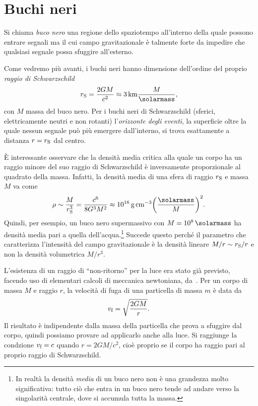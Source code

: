 \chapter{Buchi neri}
\label{sec:buchi-neri}

\label{definizione-buco-nero} Si chiama \emph{buco nero} una regione dello
spaziotempo all'interno della quale possono entrare segnali ma il cui campo
gravitazionale è talmente forte da impedire che qualsiasi segnale possa sfuggire
all'esterno.

Come vedremo più avanti, i buchi neri hanno dimensione dell'ordine del proprio
\emph{raggio di Schwarzschild}
\begin{equation}
  r_{\textup{S}} = \frac{2GM}{c^{2}} \approx
  \SI{3}{\kilo\metre} \frac{M}{\si{\solarmass}},
\end{equation}
con \(M\) massa del buco nero.  Per i buchi neri di Schwarzschild (sferici,
elettricamente neutri e non rotanti) l'\emph{orizzonte degli eventi}, la
superficie oltre la quale nessun segnale può più emergere dall'interno, si trova
esattamente a distanza \(r = r_{\textup{S}}\) dal centro.

È interessante osservare che la densità media critica alla quale un corpo ha un
raggio minore del suo raggio di Schwarzschild è inversamente proporzionale al
quadrato della massa.  Infatti, la densità media di una sfera di raggio
\(r_{\textup{S}}\) e massa \(M\) va come
\begin{equation}
  \rho \sim \frac{M}{r_{\textup{S}}^{3}} = \frac{c^{6}}{8G^{3}M^{2}} \approx
  \SI{e16}{\gram\per\centi\metre\cubed}
  \biggl(\frac{\si{\solarmass}}{M}\biggr)^{2}.
\end{equation}
Quindi, per esempio, un buco nero supermassivo con \(M = \SI{e8}{\solarmass}\)
ha densità media pari a quella dell'acqua.\footnote{In realtà la densità
  \emph{media} di un buco nero non è una grandezza molto significativa: tutto
  ciò che entra in un buco nero tende ad andare verso la singolarità centrale,
  dove si accumula tutta la massa.} Succede questo perché il parametro che
caratterizza l'intensità del campo gravitazionale è la densità lineare \(M/r
\sim r_{\textup{S}}/r\) e non la densità volumetrica \(M/r^{3}\).

L'esistenza di un raggio di ``non-ritorno'' per la luce era stato già previsto,
facendo uso di elementari calcoli di meccanica newtoniana,
da~\textcites{1784RSPT...74...35M}{laplace:exposition}.  Per un corpo di massa
\(M\) e raggio \(r\), la velocità di fuga di una particella di massa \(m\) è
data da
\begin{equation}
  v_{\textup{f}} = \sqrt{\frac{2GM}{r}}.
\end{equation}
Il risultato è indipendente dalla massa della particella che prova a sfuggire
dal corpo, quindi possiamo provare ad applicarlo anche alla luce.  Si raggiunge
la condzione \(v_{\textup{f}} = c\) quando \(r = 2GM/c^{2}\), cioè proprio se il
corpo ha raggio pari al proprio raggio di Schwarzschild.

